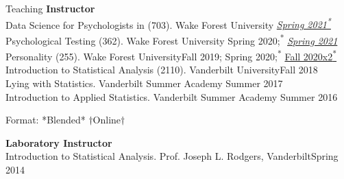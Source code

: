\begin{rSection}{\textrm{Teaching}}
\vspace*{2pt}
{\large {\bf Instructor}\\}
Data Science for Psychologists in \R (703). Wake Forest University \hfill {\href{https://www.youtube.com/playlist?list=PLKrrdtYgOUYbWGmSnbLIYwdLOnGm6une6}{\color{blue}\textit{Spring 2021\textsuperscript{*}}}}\smallskip\\
Psychological Testing  (362). Wake Forest University \hfill{Spring 2020;\textsuperscript{*} \href{https://www.youtube.com/playlist?list=PLKrrdtYgOUYYgag4erySD7L0jDcZGMlS_}{\color{blue}\textit{Spring 2021\noteBns}}}\smallskip\\%
Personality (255). Wake Forest University\hfill{Fall 2019; Spring 2020;\textsuperscript{*} \href{https://www.youtube.com/playlist?list=PLKrrdtYgOUYZpENpYddjG8n_q3bfbx8Kr}{\color{blue}Fall 2020x2\textsuperscript{*}\noteBns}}\smallskip\\
Introduction to Statistical Analysis (2110). Vanderbilt University\hfill {Fall 2018}\smallskip\\
Lying with Statistics. Vanderbilt Summer Academy \hfill{Summer 2017}\smallskip\\
Introduction to Applied Statistics. Vanderbilt Summer Academy \hfill{Summer 2016}%
\vspace{-2mm}\begin{center}\footnotesize{Format: *Blended* $\dagger$Online$\dagger$}\end{center}%
\begin{minipage}{\linewidth}
{\large {\bf Laboratory Instructor}}\\
Introduction to Statistical Analysis. Prof. Joseph L. Rodgers, Vanderbilt\hfill{Spring 2014}%

\end{minipage}
\end{rSection}

